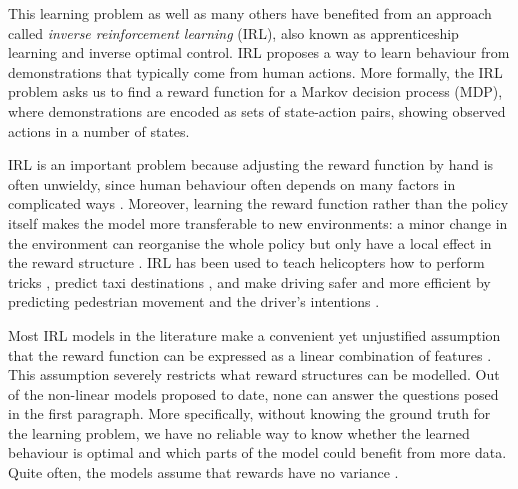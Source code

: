 \documentclass{mpaper}
\begin{document}
This learning problem \cite{DBLP:journals/ijrr/KretzschmarSSB16} as well as
many others have benefited from an approach called \emph{inverse reinforcement
  learning} (IRL), also known as apprenticeship learning and inverse optimal
control. IRL proposes a way to learn behaviour from demonstrations that
typically come from human actions. More formally, the IRL problem asks us to
find a reward function for a Markov decision process (MDP), where demonstrations
are encoded as sets of state-action pairs, showing observed actions in a number
of states.

IRL is an important problem because adjusting the reward function by hand is
often unwieldy, since human behaviour often depends on many factors in
complicated ways
\cite{DBLP:conf/icml/PieterN04}. Moreover,
learning the reward function rather than the policy itself makes the model more
transferable to new environments: a minor change in the environment can
reorganise the whole policy but only have a local effect in the reward structure
\cite{DBLP:conf/uai/JinDAS17,DBLP:conf/nips/LevinePK11}.
IRL has been used to teach helicopters how to perform tricks
\cite{DBLP:conf/nips/AbbeelCQN06}, predict taxi destinations
\cite{DBLP:conf/huc/ZiebartMDB08}, and make driving safer and more efficient by
predicting pedestrian movement \cite{DBLP:conf/iros/ZiebartRGMPBHDS09} and the
driver's intentions \cite{DBLP:conf/aaai/VogelRGR12}.

Most IRL models in the literature make a convenient yet unjustified
assumption that the reward function can be expressed as a linear combination of
features
\cite{DBLP:conf/icml/PieterN04,DBLP:conf/icml/NgR00,ziebart2008maximum}.
This assumption severely restricts what reward structures can be modelled. Out
of the non-linear models proposed to date, none can answer the questions posed
in the first paragraph. More specifically, without knowing the ground truth for
the learning problem, we have no reliable way to know whether the learned
behaviour is optimal and which parts of the model could benefit from more data.
Quite often, the models assume that rewards have no variance
\cite{DBLP:conf/nips/LevinePK11,DBLP:conf/uai/JinDAS17}.
\end{document}

